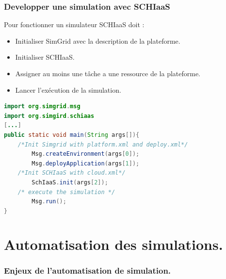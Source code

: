 \documentclass{beamer}
\begin{document}

\begin{frame}[fragile]
	\frametitle{Developper une simulation avec SCHIaaS}
	Pour fonctionner un simulateur SCHIaaS doit :
	\begin{itemize}
		\item Initialiser SimGrid avec la description de la plateforme.
		\item Initialiser SCHIaaS.
		\item Assigner au moins une tâche a une ressource de la plateforme.
		\item Lancer l'exécution de la simulation.
	\end{itemize}
	\begin{lstlisting}[basicstyle=\footnotesize,language=Java,
	backgroundcolor=\color{gray!10},
	commentstyle=\color{red!90}
	]
import org.simgrid.msg
import org.simgird.schiaas
[...]
public static void main(String args[]){
    /*Init Simgrid with platform.xml and deploy.xml*/
        Msg.createEnvironment(args[0]);
        Msg.deployApplication(args[1]);
    /*Init SCHIaaS with cloud.xml*/
        SchIaaS.init(args[2]);
    /* execute the simulation */
        Msg.run();
}
	\end{lstlisting}
\end{frame}

\section{Automatisation des simulations.}

\begin{frame}
	\frametitle{Enjeux de l'automatisation de simulation.}
\end{frame}
\end{document}
